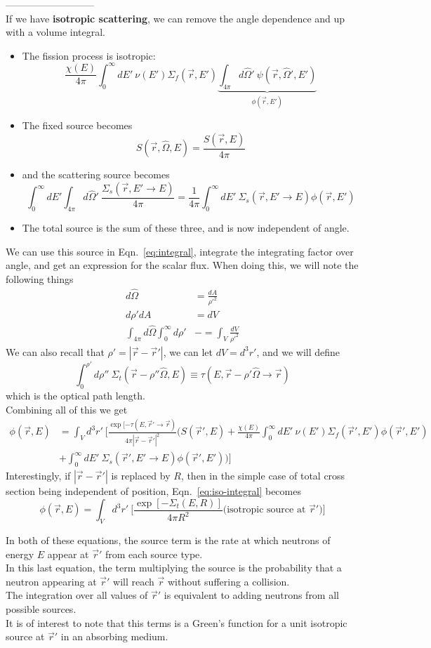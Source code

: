 \documentclass[12pt]{article}
\newcommand{\rvec}{\ensuremath{\vec{r}}}
\newcommand{\vOmega}{\ensuremath{\hat{\Omega}}}
\begin{document}
---------------------------\\
If we have \textbf{isotropic scattering}, we can remove the angle dependence and up with a volume integral.
%
\begin{itemize}
\item The fission process is isotropic:
\[\frac{\chi(E)}{4\pi} \int_0^{\infty} dE' \: \nu(E') \Sigma_f(\rvec, E') \underbrace{\int_{4\pi} d\vOmega' \: \psi(\rvec, \vOmega', E')}_{\phi(\rvec,E')}\]
\item The fixed source becomes
\[S(\rvec, \vOmega, E) = \frac{S(\rvec, E)}{4 \pi}\]
\item and the scattering source becomes
\[\int_0^{\infty} dE' \int_{4\pi} d\vOmega' \: \frac{\Sigma_s(\rvec,E' \rightarrow E)}{4\pi} = \frac{1}{4\pi}\int_0^{\infty} dE'\:\Sigma_s(\rvec,E' \rightarrow E) \phi(\rvec,E')\]
\item The total source is the sum of these three, and is now independent of angle.
\end{itemize}
%
We can use this source in Eqn.~\ref{eq:integral}, integrate the integrating factor over angle, and get an expression for the scalar flux. When doing this, we will note the following things
\begin{align*}
d\vOmega &= \frac{dA}{\rho'^2}\\
d\rho' dA &= dV \\
\int_{4\pi} d\vOmega \int_0^{\infty} d\rho' &-= \int_{V} \frac{dV}{\rho'^2}
\end{align*}
%
We can also recall that $\rho' = |\vec{r} - \vec{r}'|$, we can let $dV = d^3r'$, and we will define
\[\int_0^{\rho'} d\rho'' \: \Sigma_t(\rvec-\rho''\vOmega,E) \equiv \tau(E,\vec{r} - \rho' \vOmega \rightarrow \vec{r})
\]
which is the optical path length. \\
Combining all of this we get
\begin{align}
\phi(\rvec,E) &= \int_V d^3r' \: \biggl[\frac{\exp[-\tau(E,\vec{r}' \rightarrow \vec{r})}{4\pi|\vec{r} - \vec{r}'|^2} \biggl(S(\vec{r}',E) + \frac{\chi(E)}{4\pi} \int_0^{\infty} dE' \: \nu(E') \Sigma_f(\rvec', E')\phi(\vec{r}', E') \nonumber \\
&+ \int_0^{\infty} dE'\:\Sigma_s(\rvec',E' \rightarrow E) \phi(\rvec',E') \biggr)  \biggr]
\label{eq:iso-integral}
\end{align}
%
Interestingly, if $|\vec{r} - \vec{r}'|$ is replaced by $R$, then in the simple case of total cross section being independent of position, Eqn.~\ref{eq:iso-integral} becomes
\[\phi(\rvec,E) = \int_V d^3r' \: \biggl[\frac{\exp[-\Sigma_t(E, R)]}{4\pi R^2} \biggl( \text{isotropic source at }\vec{r}' \biggr)\biggr]\]

In both of these equations, the source term is the rate at which neutrons of energy $E$ appear at $\vec{r}'$ from each source type. \\
In this last equation, the term multiplying the source is the probability that a neutron appearing at $\vec{r}'$ will reach $\vec{r}$ without suffering a collision.\\
The integration over all values of $\vec{r}'$ is equivalent to adding neutrons from all possible sources. \\
It is of interest to note that this terms is a Green's function for a unit isotropic source at $\vec{r}'$ in an absorbing medium.
\end{document}
